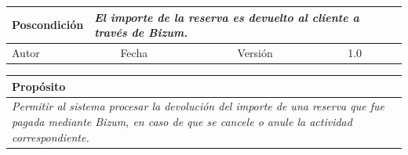 \begin{table}[H]
\begin{tabular}{llllllll}
    \multicolumn{1}{|l|}{Poscondición}                           & \multicolumn{7}{l|}{{\color[HTML]{808080} \textit{El importe de la reserva es devuelto al cliente a través de Bizum.}}}                                                                                                                                                                                                                                                       \\ \hline
    \multicolumn{1}{|l|}{Autor}                                  & \multicolumn{1}{l|}{{\color[HTML]{808080} \textit{}}}                           & \multicolumn{2}{l|}{Fecha}                                                   & \multicolumn{1}{l|}{}                          & \multicolumn{2}{l|}{Versión}                                                      & \multicolumn{1}{l|}{1.0}                                                     \\ \hline
    \end{tabular}
    \end{table}

    \begin{table}[H]
        \begin{tabular}{llllllll}
    \hline
    \multicolumn{8}{|l|}{\cellcolor[HTML]{F2F2F2}Propósito}                                                                                                                                                                                                                                                                                                                                                                                           \\ \hline
    \multicolumn{8}{|p{15cm}|}{{\color[HTML]{808080} \textit{Permitir al sistema procesar la devolución del importe de una reserva que fue pagada mediante Bizum, en caso de que se cancele o anule la actividad correspondiente.}}}                                                                                                                                                                                                             \\ \hline
    \end{tabular}
    \end{table}

